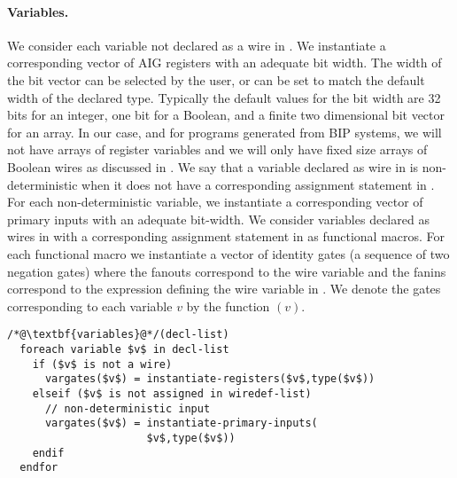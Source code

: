 \paragraph{Variables.} 
%
We consider each variable not declared as a wire 
in .
We instantiate a corresponding 
vector of AIG registers with an adequate bit width. 
The width of the bit vector can be selected by the user, 
or can be set to match the default width of the declared type. 
Typically the default values for the bit width are 
32 bits for an integer, one bit for a Boolean, and a 
finite two dimensional bit vector for an array. 
In our case, and for \caig programs generated from BIP systems, 
we will not have arrays of register variables
and we will only have fixed size arrays of Boolean wires as 
discussed in .
%
We say that a variable declared as wire in 
is non-deterministic when it does not have a corresponding assignment statement in . 
For each non-deterministic variable, we instantiate a corresponding
vector of primary inputs with an adequate bit-width. 
%
We consider variables declared as wires in  with 
a corresponding assignment statement in  as functional macros. 
For each functional macro we 
instantiate a vector of identity gates (a sequence of two negation gates) 
where the fanouts correspond to the wire variable and the fanins correspond to
the expression defining the wire variable in . 
%
We denote the gates corresponding to each variable $v$ by the function $(v)$. 
%
\begin{lstlisting}
/*@\textbf{variables}@*/(decl-list)
  foreach variable $v$ in decl-list
    if ($v$ is not a wire) 
      vargates($v$) = instantiate-registers($v$,type($v$))
    elseif ($v$ is not assigned in wiredef-list) 
      // non-deterministic input
      vargates($v$) = instantiate-primary-inputs(
                      $v$,type($v$))
    endif
  endfor
\end{lstlisting}
%

